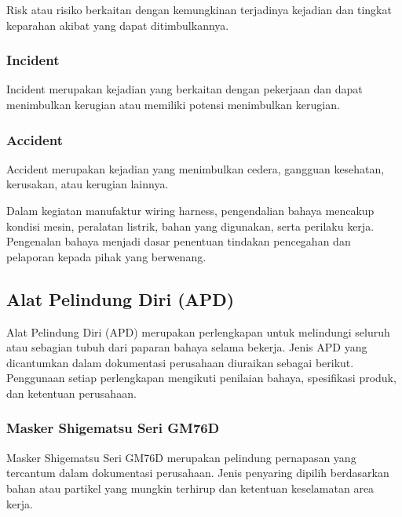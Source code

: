 Risk atau risiko berkaitan dengan kemungkinan terjadinya kejadian dan tingkat keparahan akibat yang dapat ditimbulkannya.

\subsubsection{Incident}

Incident merupakan kejadian yang berkaitan dengan pekerjaan dan dapat menimbulkan kerugian atau memiliki potensi menimbulkan kerugian.

\subsubsection{Accident}

Accident merupakan kejadian yang menimbulkan cedera, gangguan kesehatan, kerusakan, atau kerugian lainnya.

Dalam kegiatan manufaktur wiring harness, pengendalian bahaya mencakup kondisi mesin, peralatan listrik, bahan yang digunakan, serta perilaku kerja. Pengenalan bahaya menjadi dasar penentuan tindakan pencegahan dan pelaporan kepada pihak yang berwenang.

\setlength{\TinggiRuangGambar}{2.2cm}
\setlength{\BatasTinggiGambar}{3.2cm}
\subsection{Alat Pelindung Diri (APD)}

Alat Pelindung Diri (APD) merupakan perlengkapan untuk melindungi seluruh atau sebagian tubuh dari paparan bahaya selama bekerja. Jenis APD yang dicantumkan dalam dokumentasi perusahaan diuraikan sebagai berikut. Penggunaan setiap perlengkapan mengikuti penilaian bahaya, spesifikasi produk, dan ketentuan perusahaan.

\Needspace{6.8cm}
\subsubsection{Masker Shigematsu Seri GM76D}

Masker Shigematsu Seri GM76D merupakan pelindung pernapasan yang tercantum dalam dokumentasi perusahaan. Jenis penyaring dipilih berdasarkan bahan atau partikel yang mungkin terhirup dan ketentuan keselamatan area kerja.

